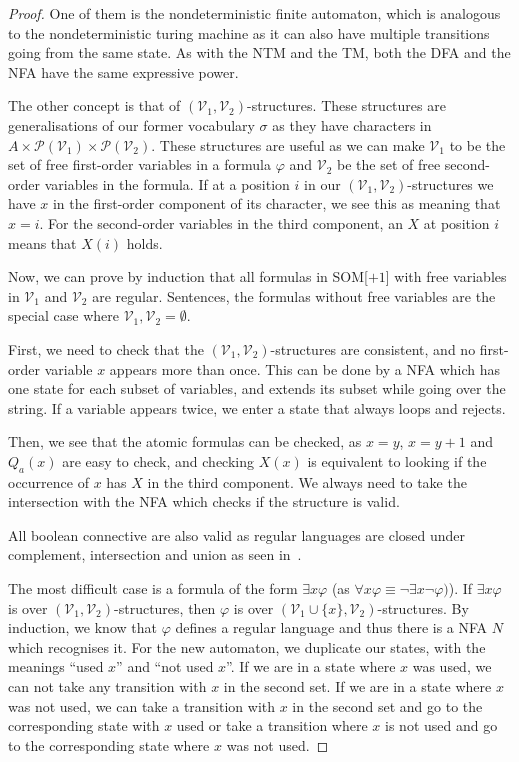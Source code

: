 \begin{proof}
    One of them is the nondeterministic finite automaton, which is analogous to the nondeterministic turing machine as it can also have multiple transitions going from the same state.
    As with the NTM and the TM, both the DFA and the NFA have the same expressive power.

    The other concept is that of $(\mathcal{V}_1, \mathcal{V}_2)$-structures.
    These structures are generalisations of our former vocabulary $\sigma$ as they have characters in $A \times \mathcal{P}(\mathcal{V}_1)\times \mathcal{P}(\mathcal{V}_2)$.
    These structures are useful as we can make $\mathcal{V}_1$ to be the set of free first-order variables in a formula $\varphi$ and $\mathcal{V}_2$ be the set of free second-order variables in the formula.
    If at a position $i$ in our $(\mathcal{V}_1, \mathcal{V}_2)$-structures we have $x$ in the first-order component of its character, we see this as meaning that $x = i$.
    For the second-order variables in the third component, an $X$ at position $i$ means that $X(i)$ holds.

    Now, we can prove by induction that all formulas in SOM[$+1$] with free variables in $\mathcal{V}_1$ and $\mathcal{V}_2$ are regular.
    Sentences, the formulas without free variables are the special case where $\mathcal{V}_1, \mathcal{V}_2 = \emptyset$.

    First, we need to check that the $(\mathcal{V}_1, \mathcal{V}_2)$-structures are consistent, and no first-order variable $x$ appears more than once.
    This can be done by a NFA which has one state for each subset of variables, and extends its subset while going over the string.
    If a variable appears twice, we enter a state that always loops and rejects.

    Then, we see that the atomic formulas can be checked, as $x = y$, $x = y + 1$ and $Q_a(x)$ are easy to check, and checking $X(x)$ is equivalent to looking if the occurrence of $x$ has $X$ in the third component.
    We always need to take the intersection with the NFA which checks if the structure is valid.

    All boolean connective are also valid as regular languages are closed under complement, intersection and union as seen in~\cite{theory-cs}.

    The most difficult case is a formula of the form $\exists x \varphi$ (as $\forall x \varphi \equiv \neg \exists x \neg \varphi)$).
    If $\exists x \varphi$ is over $(\mathcal{V}_1, \mathcal{V}_2)$-structures, then $\varphi$ is over $(\mathcal{V}_1 \cup \{x\}, \mathcal{V}_2)$-structures.
    By induction, we know that $\varphi$ defines a regular language and thus there is a NFA $N$ which recognises it.
    For the new automaton, we duplicate our states, with the meanings ``used $x$'' and ``not used $x$''.
    If we are in a state where $x$ was used, we can not take any transition with $x$ in the second set.
    If we are in a state where $x$ was not used, we can take a transition with $x$ in the second set and go to the corresponding state with $x$ used or take a transition where $x$ is not used and go to the corresponding state where $x$ was not used.


\end{proof}
